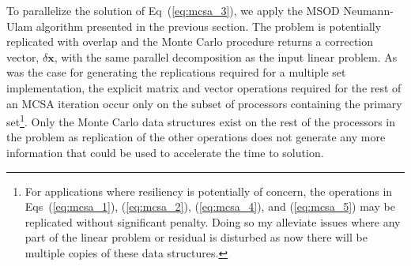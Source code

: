 \documentclass{snamc2013}
\begin{document}
To parallelize the solution of Eq~(\ref{eq:mcsa_3}), we apply the
MSOD Neumann-Ulam algorithm presented in the previous section. The
problem is potentially replicated with overlap and the Monte Carlo
procedure returns a correction vector, $\delta \mathbf{x}$, with the same
parallel decomposition as the input linear problem. As was the case
for generating the replications required for a multiple set
implementation, the explicit matrix and vector operations required for
the rest of an MCSA iteration occur only on the subset of processors
containing the primary set\footnote{For applications where resiliency
  is potentially of concern, the operations in Eqs~(\ref{eq:mcsa_1}),
  (\ref{eq:mcsa_2}), (\ref{eq:mcsa_4}), and (\ref{eq:mcsa_5}) may
  be replicated without significant penalty. Doing so my alleviate
  issues where any part of the linear problem or residual is disturbed
  as now there will be multiple copies of these data
  structures.}. Only the Monte Carlo data structures exist on the rest
of the processors in the problem as replication of the other
operations does not generate any more information that could be used
to accelerate the time to solution.

\end{document}
